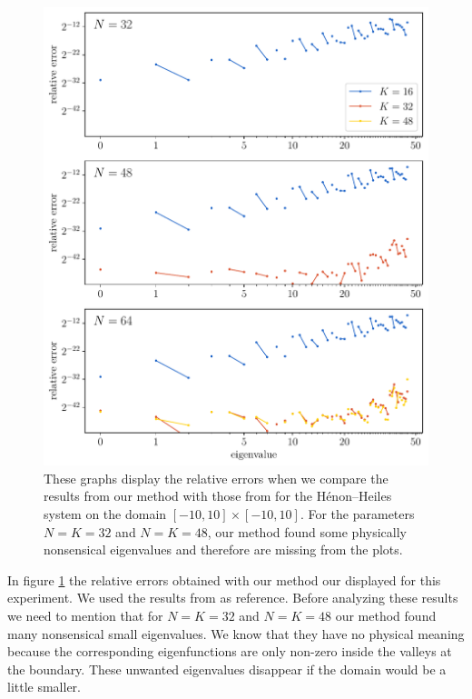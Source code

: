 \begin{figure}
    \begin{center}
        \includegraphics[width=\textwidth]{img/chapter4/nm_test_henon.pdf}
    \end{center}
    \caption{These graphs display the relative errors when we compare the results from our method with those from \cite{wang_new_2009} for the Hénon--Heiles system on the domain $[-10, 10]\times[-10, 10]$. For the parameters $N = K = 32$ and $N = K = 48$, our method found some physically nonsensical eigenvalues and therefore are missing from the plots.}
    \label{fig:c4_nm_henon_test}
\end{figure}

In figure \ref{fig:c4_nm_henon_test} the relative errors obtained with our method our displayed for this experiment. We used the results from \cite{wang_new_2009} as reference. Before analyzing these results we need to mention that for $N = K = 32$ and $N = K = 48$ our method found many nonsensical small eigenvalues. We know that they have no physical meaning because the corresponding eigenfunctions are only non-zero inside the valleys at the boundary. These unwanted eigenvalues disappear if the domain would be a little smaller.

